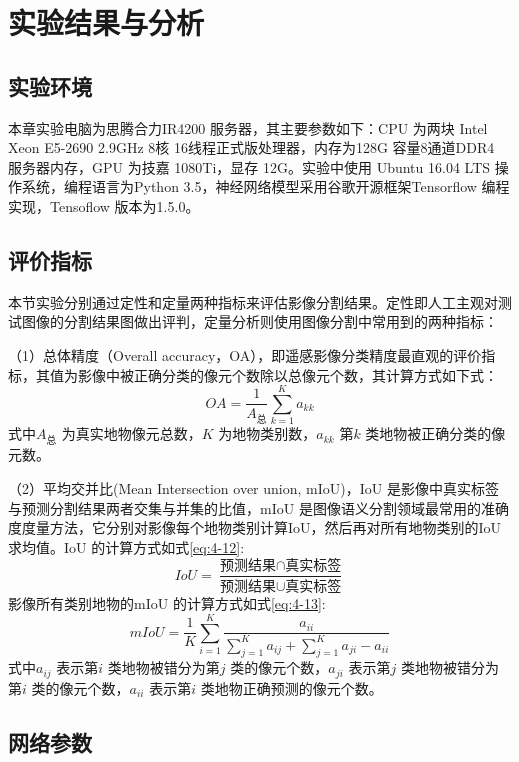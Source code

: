 \section{实验结果与分析}
\label{sec:third}
\subsection{实验环境}
\label{sec:third-1}
本章实验电脑为思腾合力IR4200 服务器，其主要参数如下：CPU 为两块 Intel Xeon E5-2690 2.9GHz 8核 16线程正式版处理器，内存为128G 容量8通道DDR4 服务器内存，GPU 为技嘉 1080Ti，显存 12G。实验中使用 Ubuntu 16.04 LTS 操作系统，编程语言为Python 3.5，神经网络模型采用谷歌开源框架Tensorflow 编程实现，Tensoflow 版本为1.5.0。

\subsection{评价指标}
\label{sec:third-2}
本节实验分别通过定性和定量两种指标来评估影像分割结果。定性即人工主观对测试图像的分割结果图做出评判，定量分析则使用图像分割中常用到的两种指标：

（1）总体精度（Overall accuracy，OA），即遥感影像分类精度最直观的评价指标，其值为影像中被正确分类的像元个数除以总像元个数，其计算方式如下式：
\begin{equation}
  \label{eq:4-11}
  OA = \frac{1}{A_{\mbox{总}}}  \sum_{k=1}^K a_{kk}
\end{equation}
式中$A_{\mbox{总}}$ 为真实地物像元总数，$K$ 为地物类别数，$a_{kk}$ 第$k$ 类地物被正确分类的像元数。

（2）平均交并比(Mean Intersection over union, mIoU)，IoU 是影像中真实标签与预测分割结果两者交集与并集的比值，mIoU 是图像语义分割领域最常用的准确度度量方法，它分别对影像每个地物类别计算IoU，然后再对所有地物类别的IoU 求均值。IoU 的计算方式如式\ref{eq:4-12}:
\begin{equation}
  \label{eq:4-12}
  IoU = \frac{\mbox{预测结果} \cap \mbox{真实标签}}{\mbox{预测结果} \cup \mbox{真实标签}}
\end{equation}
影像所有类别地物的mIoU 的计算方式如式\ref{eq:4-13}:
\begin{equation}
  \label{eq:4-13}
  mIoU = \frac{1}{K}  \sum_{i=1}^K \frac{a_{ii}}{\sum_{j=1}^Ka_{ij} + \sum_{j=1}^Ka_{ji} -a_{ii}}
\end{equation}
式中$a_{ij}$ 表示第$i$ 类地物被错分为第$j$ 类的像元个数，$a_{ji} $ 表示第$j$ 类地物被错分为第$i$ 类的像元个数，$a_{ii}$ 表示第$i$ 类地物正确预测的像元个数。


\subsection{网络参数}
\label{sec:third-3}


